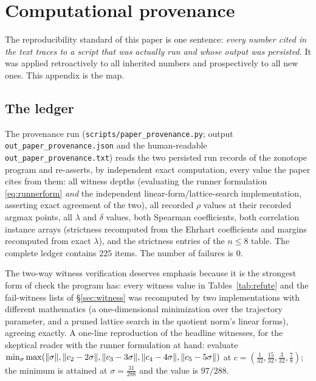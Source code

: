 
\section{Computational provenance}\label{sec:prov}

The reproducibility standard of this paper is one sentence:
\emph{every number cited in the text traces to a script that was
actually run and whose output was persisted.} It was applied
retroactively to all inherited numbers and prospectively to all new
ones. This appendix is the map.

\subsection{The ledger}

The provenance run (\texttt{scripts/paper\_provenance.py}; output
\texttt{out\_paper\_provenance.json} and the human-readable
\texttt{out\_paper\_provenance.txt}) reads the two persisted run records
of the zonotope program and re-asserts, by independent exact
computation, every value the paper cites from them: all witness depths
(evaluating the runner formulation \eqref{eq:runnerform} \emph{and} the
independent linear-form/lattice-search implementation, asserting exact
agreement of the two), all recorded $\rho$ values at their recorded
argmax points, all $\lambda$ and $\delta$ values, both Spearman
coefficients, both correlation instance arrays (strictness recomputed
from the Ehrhart coefficients and margins recomputed from exact
$\lambda$), and the strictness entries of the $n\le8$ table. The
complete ledger contains $225$ items. The number of failures is $0$.

The two-way witness verification deserves emphasis because it is the
strongest form of check the program has: every witness value in
Tables~\ref{tab:refute} and the fail-witness lists of
\S\ref{sec:witness} was recomputed by two implementations with different
mathematics (a one-dimensional minimization over the trajectory
parameter, and a pruned lattice search in the quotient norm's linear
forms), agreeing exactly. A one-line reproduction of the headline
witnesses, for the skeptical reader with the runner formulation at
hand: evaluate
$\min_\sigma\max(\lVert \sigma \rVert,\lVert c_2-2\sigma \rVert,\lVert c_3-3\sigma \rVert,
\lVert c_4-4\sigma \rVert,\lVert c_5-5\sigma \rVert)$ at
$c=(\tfrac1{32},\tfrac{15}{32},\tfrac3{32},\tfrac78)$; the minimum is
attained at $\sigma=\tfrac{31}{288}$ and the value is $97/288$.

